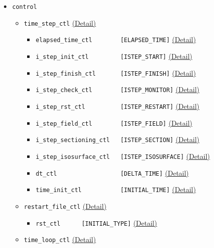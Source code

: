 \begin{itemize}
\begin{itemize}
\begin{itemize}
\begin{itemize}
			\end{itemize}
%
		\end{itemize}
%
	\end{itemize}
%
\item \verb|control|
	\begin{itemize}
	\item \verb|time_step_ctl|
		\label{href_i:time_step_ctl}
    		\hyperref[href_t:time_step_ctl]{(Detail)}
		\begin{itemize}
		\item \verb|elapsed_time_ctl        [ELAPSED_TIME]|
	    		\hyperref[href_t:elapsed_time_ctl]{(Detail)}
		\item \verb|i_step_init_ctl         [ISTEP_START]|
	    		\hyperref[href_t:i_step_init_ctl]{(Detail)}
		\item \verb|i_step_finish_ctl       [ISTEP_FINISH]|
	    		\hyperref[href_t:i_step_finish_ctl]{(Detail)}
		\item \verb|i_step_check_ctl        [ISTEP_MONITOR]|
	    		\hyperref[href_t:i_step_check_ctl]{(Detail)}
		\item \verb|i_step_rst_ctl          [ISTEP_RESTART]|
	    		\hyperref[href_t:i_step_rst_ctl]{(Detail)}
		\item \verb|i_step_field_ctl        [ISTEP_FIELD]|
	    		\hyperref[href_t:i_step_field_ctl]{(Detail)}
        \item \verb|i_step_sectioning_ctl   [ISTEP_SECTION]|
                \hyperref[href_t:i_step_sectioning_ctl]{(Detail)}
        \item \verb|i_step_isosurface_ctl   [ISTEP_ISOSURFACE]|
                \hyperref[href_t:i_step_isosurface_ctl]{(Detail)}
		\item \verb|dt_ctl                  [DELTA_TIME]|
	    		\hyperref[href_t:dt_ctl]{(Detail)}
		\item \verb|time_init_ctl           [INITIAL_TIME]|
	    		\hyperref[href_t:time_init_ctl]{(Detail)}
		\end{itemize}
%
	\item \verb|restart_file_ctl|
		\label{href_i:restart_file_ctl}
    		\hyperref[href_t:restart_file_ctl]{(Detail)}
		\begin{itemize}
		\item \verb|rst_ctl      [INITIAL_TYPE]|
	    		\hyperref[href_t:rst_ctl]{(Detail)}
		\end{itemize}
%
	\item \verb|time_loop_ctl|
		\label{href_i:time_loop_ctl}
    		\hyperref[href_t:time_loop_ctl]{(Detail)}
		\begin{itemize}

\end{itemize}
\end{itemize}
\end{itemize}

